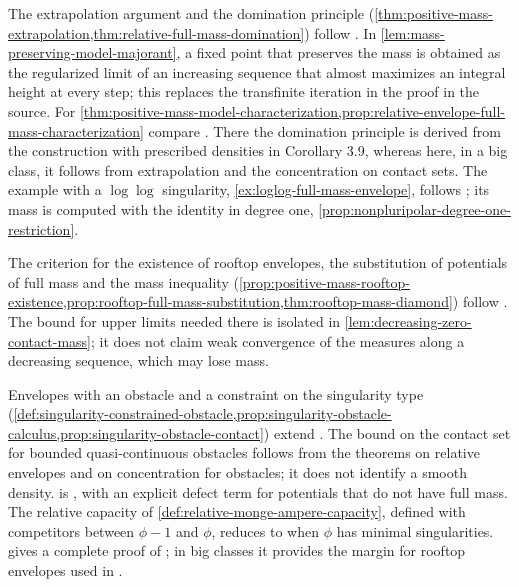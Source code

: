The extrapolation argument and the domination principle (\cref{thm:positive-mass-extrapolation,thm:relative-full-mass-domination}) follow \cite[Lemma~2.4.4 and Theorem~2.4.5]{XiaSampleBook}. In \cref{lem:mass-preserving-model-majorant}, a fixed point that preserves the mass is obtained as the regularized limit of an increasing sequence that almost maximizes an integral height at every step; this replaces the transfinite iteration in the proof in the source. For \cref{thm:positive-mass-model-characterization,prop:relative-envelope-full-mass-characterization} compare \cite[Theorems 3.12 and 3.14]{DDNL18mono}. There the domination principle is derived from the construction with prescribed densities in Corollary 3.9, whereas here, in a big class, it follows from extrapolation and the concentration on contact sets. The example with a $\log\log$ singularity, \cref{ex:loglog-full-mass-envelope}, follows \cite[Example~3.1.1]{XiaSampleBook}; its mass is computed with the identity in degree one, \cref{prop:nonpluripolar-degree-one-restriction}.

The criterion for the existence of rooftop envelopes, the substitution of potentials of full mass and the mass inequality (\cref{prop:positive-mass-rooftop-existence,prop:rooftop-full-mass-substitution,thm:rooftop-mass-diamond}) follow \cite[Proposition~3.1.5, Lemma~3.1.2 and Theorem~3.1.3]{XiaSampleBook}. The bound for upper limits needed there is isolated in \cref{lem:decreasing-zero-contact-mass}; it does not claim weak convergence of the measures along a decreasing sequence, which may lose mass.

Envelopes with an obstacle and a constraint on the singularity type (\cref{def:singularity-constrained-obstacle,prop:singularity-obstacle-calculus,prop:singularity-obstacle-contact}) extend \cite[Definition~3.1.4]{XiaSampleBook}. The bound on the contact set for bounded quasi-continuous obstacles follows from the theorems on relative envelopes and on concentration for obstacles; it does not identify a smooth density.  is \cite[Proposition~3.1.15]{XiaSampleBook}, with an explicit defect term for potentials that do not have full mass. The relative capacity of \cref{def:relative-monge-ampere-capacity}, defined with competitors between $\phi-1$ and $\phi$, reduces to \cite[Definition~2.3.1]{XiaSampleBook} when $\phi$ has minimal singularities.  gives a complete proof of \cite[Theorem~6.1.1]{XiaSampleBook}; in big classes it provides the margin for rooftop envelopes used in \cite[Theorem 3.1.1]{VuXiaNakamaye}.


